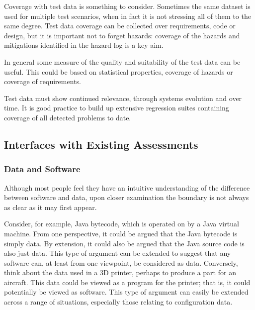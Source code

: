 Coverage with test data is something to consider. Sometimes the same \gls{dataset} is used for multiple test scenarios, when in fact it is not stressing all of them to the same degree. Test data coverage can be collected over requirements, code or design, but it is important not to forget hazards: coverage of the hazards and mitigations identified in the \gls{hazard log} is a key aim. 

In general some measure of the quality and suitability of the test data can be useful. This could be based on statistical properties, coverage of hazards or coverage of requirements. 

Test data must show continued relevance, through systems evolution and over time. It is good practice to build up extensive regression suites containing coverage of all detected problems to date.

\subsection{Interfaces with Existing Assessments}
\subsubsection{Data and Software}
Although most people feel they have an intuitive understanding of the difference between software and data, upon closer examination the boundary is not always as clear as it may first appear.

Consider, for example, Java bytecode, which is operated on by a Java virtual machine. From one perspective, it could be argued that the Java bytecode is simply data. By extension, it could also be argued that the Java source code is also just data. This type of argument can be extended to suggest that any software can, at least from one viewpoint, be considered as data. Conversely, think about the data used in a 3D printer, perhaps to produce a part for an aircraft. This data could be viewed as a program for the printer; that is, it could potentially be viewed as software. This type of argument can easily be extended across a range of situations, especially those relating to \gls{configuration data}.

